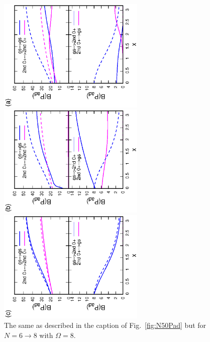 \documentclass[11pt]{book} %
\begin{document}
\begin{figure}[t]
 \begin{minipage}{0.3\hsize}
 \begin{center}
  \includegraphics[width=70mm,angle=-90]{images/N8Pad_CQ.eps}
 \end{center}
 \captionsetup{labelformat=empty,labelsep=none}
 \end{minipage}
 \begin{minipage}{0.3\hsize}
 \begin{center}
  \includegraphics[width=70mm,angle=-90]{images/N8Pad_FD.eps}
 \end{center}
 \captionsetup{labelformat=empty,labelsep=none}
 \end{minipage}
 \begin{minipage}{0.3\hsize}
 \begin{center}
  \includegraphics[width=70mm,angle=-90]{images/N8Pad_SPA.eps}
 \end{center}
 \captionsetup{labelformat=empty,labelsep=none}
 \end{minipage}
	\caption{The same as described in the caption of Fig.~\ref{fig:N50Pad} but for $N=6\rightarrow 8$
	with $\Omega=8$.
}
 \label{fig:N8Pad}
\end{figure}
\end{document}
